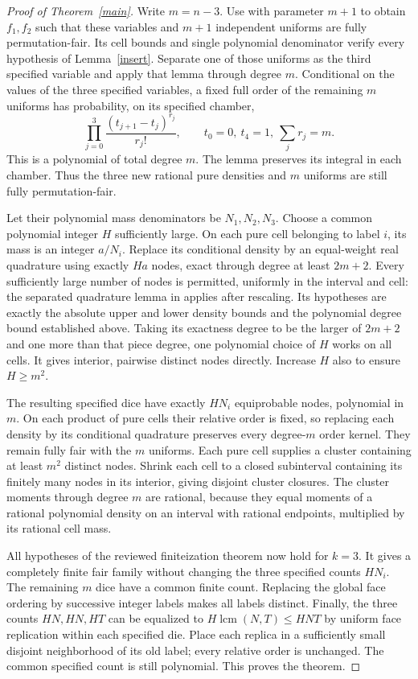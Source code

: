 \documentclass[11pt]{article}
\begin{document}
\begin{proof}[Proof of Theorem~\ref{main}]
Write $m=n-3$. Use
with parameter $m+1$ to obtain $f_1,f_2$ such that these variables
and $m+1$ independent uniforms are fully permutation-fair. Its cell
bounds and single polynomial denominator verify every hypothesis of
Lemma~\ref{insert}. Separate one of those uniforms as the third
specified variable and apply that lemma through degree $m$.
Conditional on the values of the three specified variables, a fixed
full order of the remaining $m$ uniforms has probability, on its
specified chamber,
\[
 \prod_{j=0}^3\frac{(t_{j+1}-t_j)^{r_j}}{r_j!},
 \qquad t_0=0,\ t_4=1,\ \sum_jr_j=m.
\]
This is a polynomial of total degree $m$. The lemma preserves its
integral in each chamber. Thus the three new rational pure densities
and $m$ uniforms are still fully permutation-fair.

Let their polynomial mass denominators be $N_1,N_2,N_3$. Choose a
common polynomial integer $H$ sufficiently large. On each pure cell
belonging to label $i$, its mass is an integer $a/N_i$. Replace its
conditional density by an equal-weight real quadrature using exactly
$Ha$ nodes, exact through degree at least $2m+2$.
Every sufficiently large number of nodes is permitted, uniformly
in the interval and cell: the separated quadrature lemma in
applies after rescaling. Its hypotheses are exactly the absolute upper
and lower density bounds and the polynomial degree bound established
above. Taking its exactness degree to be the larger of $2m+2$ and one
more than that piece degree, one polynomial choice of $H$ works on
all cells. It gives interior, pairwise distinct nodes directly.
Increase $H$ also to ensure $H\ge m^2$.

The resulting specified dice have exactly $HN_i$ equiprobable nodes,
polynomial in $m$. On each product of pure cells their relative order
is fixed, so replacing each density by its conditional quadrature
preserves every degree-$m$ order kernel. They remain fully fair with
the $m$ uniforms. Each pure cell supplies a cluster containing at
least $m^2$ distinct nodes. Shrink each cell to a closed subinterval
containing its finitely many nodes in its interior, giving disjoint
cluster closures. The cluster moments through degree $m$ are rational,
because they equal moments of a rational polynomial density on an
interval with rational endpoints, multiplied by its rational cell mass.

All hypotheses of the reviewed finiteization theorem
now hold for $k=3$. It gives a completely finite fair family without
changing the three specified counts $HN_i$. The remaining $m$ dice
have a common finite count. Replacing the global face ordering by
successive integer labels makes all labels distinct. Finally, the three
counts $HN,HN,HT$ can be equalized to $H\operatorname{lcm}(N,T)\le HNT$
by uniform face replication within each specified die. Place each replica
in a sufficiently small disjoint neighborhood of its old label; every
relative order is unchanged. The common specified count is still polynomial.
This proves the theorem.
\end{proof}
\end{document}
